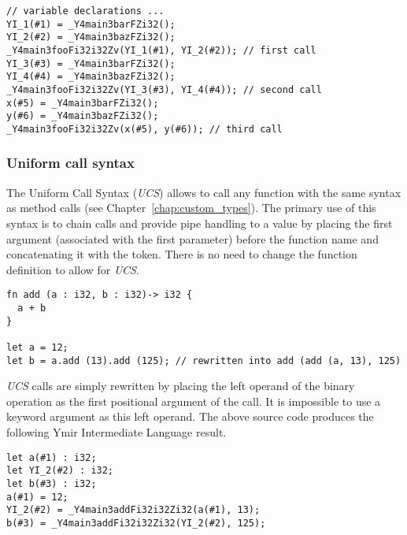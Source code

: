 \begin{lstlisting}[style=intermediateVerb]
// variable declarations ...
YI_1(#1) = _Y4main3barFZi32();
YI_2(#2) = _Y4main3bazFZi32();
_Y4main3fooFi32i32Zv(YI_1(#1), YI_2(#2)); // first call
YI_3(#3) = _Y4main3barFZi32();
YI_4(#4) = _Y4main3bazFZi32();
_Y4main3fooFi32i32Zv(YI_3(#3), YI_4(#4)); // second call
x(#5) = _Y4main3barFZi32();
y(#6) = _Y4main3bazFZi32();
_Y4main3fooFi32i32Zv(x(#5), y(#6)); // third call
\end{lstlisting}

\subsubsection {Uniform call syntax}

The Uniform Call Syntax (\textit{UCS}) allows to call any function with the same
syntax as method calls (see Chapter~\ref{chap:custom_types}). The primary use of
this syntax is to chain calls and provide pipe handling to a value by placing
the first argument (associated with the first parameter) before the function
name and concatenating it with the  token. There is no need to change
the function definition to allow for \textit{UCS}.

\begin{lstlisting}[style=coloredverbatim]
fn add (a : i32, b : i32)-> i32 {
  a + b
}

let a = 12;
let b = a.add (13).add (125); // rewritten into add (add (a, 13), 125)
\end{lstlisting}

\textit{UCS} calls are simply rewritten by placing the left operand of the
binary operation  as the first positional argument of the call. It is
impossible to use a keyword argument as this left operand. The above source code
produces the following Ymir Intermediate Language result.
\smallskip

\begin{lstlisting}[style=intermediateVerb]
let a(#1) : i32;
let YI_2(#2) : i32;
let b(#3) : i32;
a(#1) = 12;
YI_2(#2) = _Y4main3addFi32i32Zi32(a(#1), 13);
b(#3) = _Y4main3addFi32i32Zi32(YI_2(#2), 125);
\end{lstlisting}


